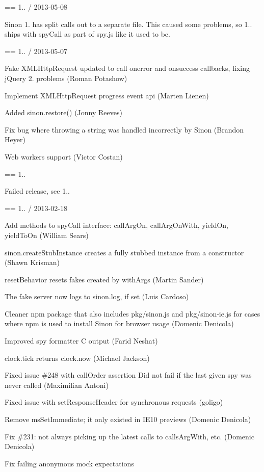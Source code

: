 == 1.. / 2013-\/05-\/08


\begin{DoxyItemize}
\item Sinon 1. has split calls out to a separate file. This caused some problems, so 1.. ships with spy\+Call as part of spy.\+js like it used to be.
\end{DoxyItemize}

== 1.. / 2013-\/05-\/07


\begin{DoxyItemize}
\item Fake X\+M\+L\+Http\+Request updated to call onerror and onsuccess callbacks, fixing j\+Query 2. problems (Roman Potashow)
\item Implement X\+M\+L\+Http\+Request progress event api (Marten Lienen)
\item Added sinon.\+restore() (Jonny Reeves)
\item Fix bug where throwing a string was handled incorrectly by Sinon (Brandon Heyer)
\item Web workers support (Victor Costan)
\end{DoxyItemize}

== 1..


\begin{DoxyItemize}
\item Failed release, see 1..
\end{DoxyItemize}

== 1.. / 2013-\/02-\/18
\begin{DoxyItemize}
\item Add methods to spy\+Call interface\+: call\+Arg\+On, call\+Arg\+On\+With, yield\+On, yield\+To\+On (William Sears)
\item sinon.\+create\+Stub\+Instance creates a fully stubbed instance from a constructor (Shawn Krisman)
\item reset\+Behavior resets fakes created by with\+Args (Martin Sander)
\item The fake server now logs to sinon.\+log, if set (Luis Cardoso)
\item Cleaner npm package that also includes pkg/sinon.\+js and pkg/sinon-\/ie.\+js for cases where npm is used to install Sinon for browser usage (Domenic Denicola)
\item Improved spy formatter C output (Farid Neshat)
\item clock.\+tick returns clock.\+now (Michael Jackson)
\item Fixed issue \#248 with call\+Order assertion Did not fail if the last given spy was never called (Maximilian Antoni)
\item Fixed issue with set\+Response\+Header for synchronous requests (goligo)
\item Remove ms\+Set\+Immediate; it only existed in I\+E10 previews (Domenic Denicola)
\item Fix \#231\+: not always picking up the latest calls to calls\+Arg\+With, etc. (Domenic Denicola)
\item Fix failing anonymous mock expectations
\end{DoxyItemize}

